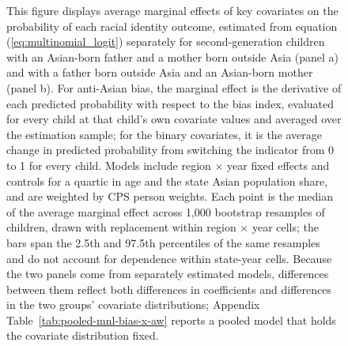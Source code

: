 \documentclass[12pt,english]{article}
\providecommand{\DIFdelbegin}{} %
\providecommand{\DIFaddbeginFL}{} %
\providecommand{\DIFaddendFL}{} %
\providecommand{\DIFdelbeginFL}{} %
\providecommand{\DIFdelendFL}{} %
\newcommand{\DIFscaledelfig}{0.5}
\newlength{\DIFdelgraphicswidth} %
\newlength{\DIFdelgraphicsheight} %
\newcommand{\DIFaddincludegraphics}[2][]{{\color{blue}\fbox{\DIFOincludegraphics[#1]{#2}}}} %
\newcommand{\DIFdelincludegraphics}[2][]{%
\sbox{\DIFdelgraphicsbox}{\DIFOincludegraphics[#1]{#2}}%
\settoboxwidth{\DIFdelgraphicswidth}{\DIFdelgraphicsbox} %
\settoboxtotalheight{\DIFdelgraphicsheight}{\DIFdelgraphicsbox} %
\scalebox{\DIFscaledelfig}{%
\parbox[b]{\DIFdelgraphicswidth}{\usebox{\DIFdelgraphicsbox}\\[-\baselineskip] \rule{\DIFdelgraphicswidth}{0em}}\llap{\resizebox{\DIFdelgraphicswidth}{\DIFdelgraphicsheight}{%
\setlength{\unitlength}{\DIFdelgraphicswidth}%
\begin{picture}(1,1)%
\thicklines\linethickness{2pt} %
{\color[rgb]{1,0,0}\put(0,0){\framebox(1,1){}}}%
{\color[rgb]{1,0,0}\put(0,0){\line( 1,1){1}}}%
{\color[rgb]{1,0,0}\put(0,1){\line(1,-1){1}}}%
\end{picture}%
}\hspace*{3pt}}} %
} %
\DeclareRobustCommand{\DIFdelbegin}{\DIFOdelbegin \let\includegraphics\DIFdelincludegraphics} %
\DeclareRobustCommand{\DIFaddbeginFL}{\DIFOaddbeginFL \let\includegraphics\DIFaddincludegraphics} %
\DeclareRobustCommand{\DIFaddendFL}{\DIFOaddendFL \let\includegraphics\DIFOincludegraphics} %
\DeclareRobustCommand{\DIFdelbeginFL}{\DIFOdelbeginFL \let\includegraphics\DIFdelincludegraphics} %
\DeclareRobustCommand{\DIFdelendFL}{\DIFOaddendFL \let\includegraphics\DIFOincludegraphics} %
\begin{document}
\begin{center}
\begin{figure}[!htb]
\DIFdelbeginFL %
\DIFdelendFL \DIFaddbeginFL \caption*{\footnotesize{This figure displays average marginal effects of key covariates on the probability of each racial identity outcome, estimated from equation (\ref{eq:multinomial_logit}) separately for second-generation children with an Asian-born father and a mother born outside Asia (panel a) and with a father born outside Asia and an Asian-born mother (panel b). For anti-Asian bias, the marginal effect is the derivative of each predicted probability with respect to the bias index, evaluated for every child at that child's own covariate values and averaged over the estimation sample; for the binary covariates, it is the average change in predicted probability from switching the indicator from 0 to 1 for every child. Models include region $\times$ year fixed effects and controls for a quartic in age and the state Asian population share, and are weighted by CPS person weights. Each point is the median of the average marginal effect across 1{,}000 bootstrap resamples of children, drawn with replacement within region $\times$ year cells; the bars span the 2.5th and 97.5th percentiles of the same resamples and do not account for dependence within state-year cells. Because the two panels come from separately estimated models, differences between them reflect both differences in coefficients and differences in the two groups' covariate distributions; Appendix Table~\ref{tab:pooled-mnl-bias-x-aw} reports a pooled model that holds the covariate distribution fixed.}}
\DIFaddendFL \end{figure}
\end{center}

\pagebreak
\newpage
\DIFdelbegin %
\end{document}
